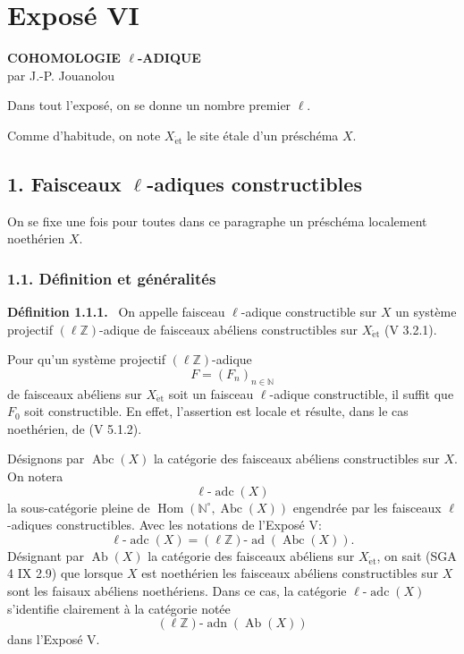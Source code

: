 \documentclass[11pt]{article}
\newenvironment{statement}[1]{\par\medskip\noindent\textbf{#1.}\ }{\par\medskip}
\DeclareMathOperator{\Hom}{Hom}
\providecommand{\Hom}{\operatorname{Hom}}
\providecommand{\adn}{\operatorname{adn}}
\providecommand{\Ab}{\operatorname{Ab}}
\providecommand{\Abc}{\operatorname{Abc}}
\providecommand{\adc}{\operatorname{adc}}
\providecommand{\ad}{\operatorname{ad}}
\providecommand{\adn}{\operatorname{adn}}
\begin{document}
\section*{Exposé VI}

\begin{center}
\textbf{COHOMOLOGIE \(\ell\)-ADIQUE}\\[0.5em]
par J.-P. Jouanolou
\end{center}

Dans tout l'exposé, on se donne un nombre premier \(\ell\).

Comme d'habitude, on note \(X_{\mathrm{\acute et}}\) le site étale d'un préschéma \(X\).

\subsection*{1. Faisceaux \(\ell\)-adiques constructibles}

On se fixe une fois pour toutes dans ce paragraphe un préschéma localement noethérien \(X\).

\subsubsection*{1.1. Définition et généralités}

\begin{statement}{Définition 1.1.1}
On appelle faisceau \(\ell\)-adique constructible sur \(X\) un système projectif \((\ell\mathbb Z)\)-adique de faisceaux abéliens constructibles sur \(X_{\mathrm{\acute et}}\) (V 3.2.1).
\end{statement}

Pour qu'un système projectif \((\ell\mathbb Z)\)-adique
\[
F=(F_n)_{n\in\mathbb N}
\]
de faisceaux abéliens sur \(X_{\mathrm{\acute et}}\) soit un faisceau \(\ell\)-adique constructible, il suffit que \(F_0\) soit constructible. En effet, l'assertion est locale et résulte, dans le cas noethérien, de (V 5.1.2).

Désignons par \(\Abc(X)\) la catégorie des faisceaux abéliens constructibles sur \(X\). On notera
\[
\ell\text{-}\adc(X)
\]
la sous-catégorie pleine de \(\Hom(\mathbb N^{\circ},\Abc(X))\) engendrée par les faisceaux \(\ell\)-adiques constructibles. Avec les notations de l'Exposé V:
\[
\ell\text{-}\adc(X)=(\ell\mathbb Z)\text{-}\ad(\Abc(X)).
\]
Désignant par \(\Ab(X)\) la catégorie des faisceaux abéliens sur \(X_{\mathrm{\acute et}}\), on sait (SGA 4 IX 2.9) que lorsque \(X\) est noethérien les faisceaux abéliens constructibles sur \(X\) sont les faisaux abéliens noethériens. Dans ce cas, la catégorie \(\ell\text{-}\adc(X)\) s'identifie clairement à la catégorie notée
\[
(\ell\mathbb Z)\text{-}\adn(\Ab(X))
\]
dans l'Exposé V.
\end{document}

